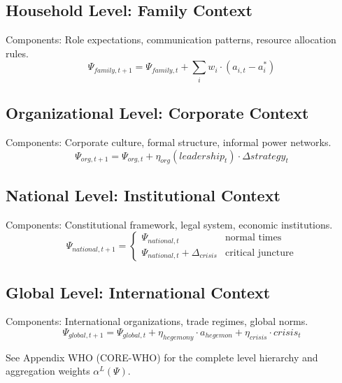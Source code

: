 \subsection{Household Level: Family Context}

Components: Role expectations, communication patterns, resource allocation rules.
\begin{equation}
\Psi_{family, t+1} = \Psi_{family, t} + \sum_i w_i \cdot (a_{i,t} - a_i^*)
\end{equation}

\subsection{Organizational Level: Corporate Context}

Components: Corporate culture, formal structure, informal power networks.
\begin{equation}
\Psi_{org, t+1} = \Psi_{org, t} + \eta_{org}(leadership_t) \cdot \Delta strategy_t
\end{equation}

\subsection{National Level: Institutional Context}

Components: Constitutional framework, legal system, economic institutions.
\begin{equation}
\Psi_{national, t+1} = \begin{cases}
\Psi_{national, t} & \text{normal times} \\
\Psi_{national, t} + \Delta_{crisis} & \text{critical juncture}
\end{cases}
\end{equation}

\subsection{Global Level: International Context}

Components: International organizations, trade regimes, global norms.
\begin{equation}
\Psi_{global, t+1} = \Psi_{global, t} + \eta_{hegemony} \cdot a_{hegemon} + \eta_{crisis} \cdot crisis_t
\end{equation}

\begin{cross-reference}
See Appendix WHO (CORE-WHO) for the complete level hierarchy
and aggregation weights $\alpha^L(\Psi)$.
\end{cross-reference}


